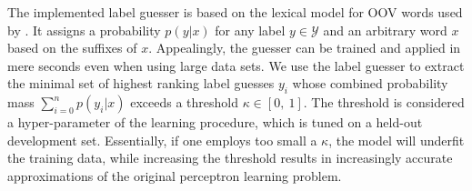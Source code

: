 \documentclass[smallextended]{svjour3}       %
\begin{document}
The implemented label guesser is based on the lexical model for OOV
words used by \cite{brants2000}. It assigns a probability $p(y|x)$ for
any label $y \in \mathcal{Y}$ and an arbitrary word $x$ based on the
suffixes of $x$.  Appealingly, the guesser can be trained and applied
in mere seconds even when using large data sets.
We use the label guesser to extract the minimal set of highest ranking label guesses $y_i$ whose combined probability mass $\sum_{i = 0}^n p(y_i|x)$ exceeds a threshold $\kappa \in [0,\ 1]$. The threshold is considered a hyper-parameter of the learning procedure, which is tuned on a held-out development set. Essentially, if one employs too small a $\kappa$, the model will underfit the training data, while increasing the threshold results in increasingly accurate approximations of the original perceptron learning problem.  
\end{document}
